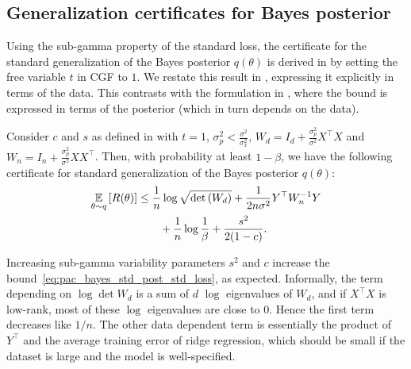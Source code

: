 \subsection{Generalization certificates for Bayes posterior}
\label{ss:bayes_cert}
Using the sub-gamma property of the standard loss, the certificate for the standard generalization of the Bayes posterior $q(\theta)$ is derived in \citet{germain2016pac} by setting the free variable $t$ in CGF to $1$. We restate this result in , expressing it explicitly in terms of the data. This contrasts with the formulation in \citet[Corollary 5]{germain2016pac}, where the bound is expressed in terms of the posterior (which in turn depends on the data). %

\begin{theorem} \label{thm:std_post_std_loss}
Consider $c$ and $s$ as defined in  with $t=1$, $\sigma_p^2 < \frac{\sigma^2}{\sigma_x^2}$, $W_d= I_d + \frac{\sigma_p^2}{\sigma^2} X^\top X$ and $W_n= I_n + \frac{\sigma_p^2}{\sigma^2} XX^\top$. Then, with probability at least $1-\beta$, we have the following certificate for standard generalization of the Bayes posterior $q(\theta)$: 
\begin{align}
\underset{\theta \sim q}{\mathbb{E}}\left[R(\theta)\right] &\leq \frac{1}{n} \log \sqrt{\det \left( W_d \right)} + \frac{1}{2n\sigma^2} Y^\top W_n^{-1} Y  \nonumber \\
&\qquad + \frac{1}{n} \log \frac{1}{\beta}  +\frac{s^2}{2(1-c)}.
\label{eq:pac_bayes_std_post_std_loss}
\end{align}
\end{theorem}
Increasing sub-gamma variability parameters $s^2$ and $c$ increase the bound~\eqref{eq:pac_bayes_std_post_std_loss}, as expected. 
Informally, the term depending on $\log \det W_d$ is a sum of $d$ $\log$ eigenvalues of $W_d$, and if $X^\top X$ is low-rank, most of these $\log$ eigenvalues are close to $0$. 
Hence the first term decreases like $1/n$.
The other data dependent term is essentially the product of $Y^\top$ and the average training error of ridge regression, which should be small if the dataset is large and the model is well-specified.


